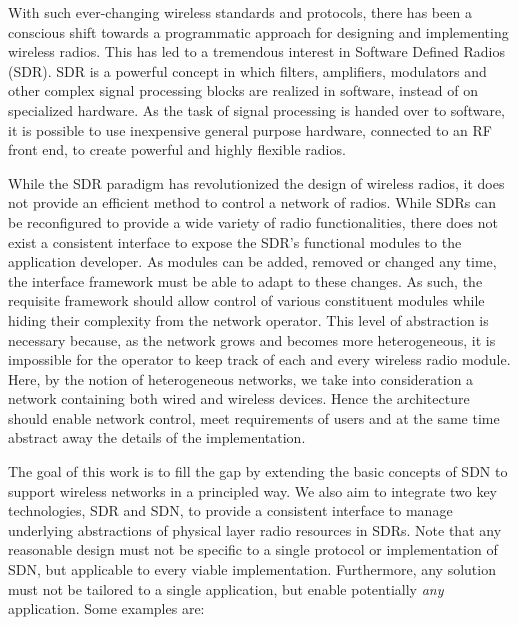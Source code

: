 With such ever-changing wireless standards and protocols, there has been a conscious shift towards a programmatic approach for designing and implementing wireless radios. This has led to a tremendous interest in Software Defined Radios (SDR). SDR is a powerful concept in which filters, amplifiers, modulators and other complex signal processing blocks are realized in software, instead of on specialized hardware. As the task of signal processing is handed over to software, it is possible to use inexpensive general purpose hardware, connected to an RF front end, to create powerful and highly flexible radios.  

While the SDR paradigm has revolutionized the design of wireless radios, it does not provide an efficient method to control a network of radios. While SDRs can be reconfigured to provide a wide variety of radio functionalities, there does not exist a consistent interface to expose the SDR's functional modules to the application developer. As modules can be added, removed or changed any time, the interface framework must be able to adapt to these changes. As such, the requisite framework should allow control of various constituent modules while hiding their complexity from the network operator. This level of abstraction is necessary because, as the network grows and becomes more heterogeneous, it is impossible for the operator to keep track of each and every wireless radio module. Here, by the notion of heterogeneous networks, we take into consideration a network containing both wired and wireless devices. Hence the architecture should enable network control, meet requirements of users and at the same time abstract away the details of the implementation.

The goal of this work is to fill the gap by extending the basic concepts of SDN to support wireless networks in a principled way. We also aim to integrate two key technologies, SDR and SDN, to provide a consistent interface to manage underlying abstractions of physical layer radio resources in SDRs. Note that any reasonable design must not be specific to a single protocol or implementation of SDN, but applicable to every viable implementation. Furthermore, any solution must not be tailored to a single application, but enable potentially \emph{any} application. Some examples are:

